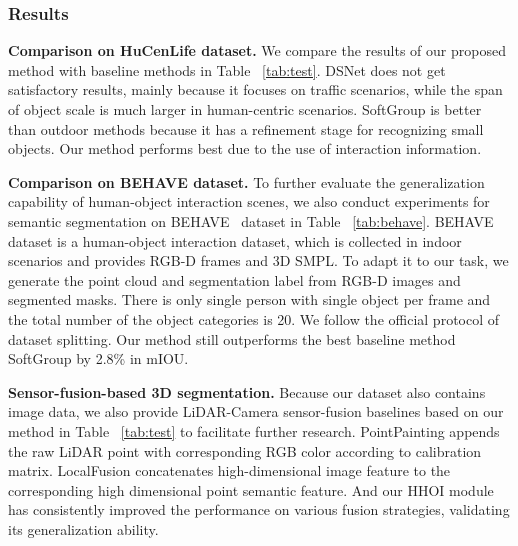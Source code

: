 \subsubsection{Results}

\noindent\textbf{Comparison on HuCenLife dataset. } 
We compare the results of our proposed method with baseline methods in Table ~\ref{tab:test}. DSNet does not get satisfactory results, mainly because it focuses on traffic scenarios, while the span of object scale is much larger in human-centric scenarios. SoftGroup is better than outdoor methods because it has a refinement stage for recognizing small objects. Our method performs best due to the use of interaction information.




\noindent\textbf{Comparison on BEHAVE dataset. } 
To further evaluate the generalization capability of human-object interaction scenes, we also conduct experiments for semantic segmentation on BEHAVE~\cite{bhatnagar2022behave} dataset in Table ~\ref{tab:behave}. BEHAVE dataset is a human-object interaction dataset, which is collected in indoor scenarios and provides RGB-D frames and 3D SMPL. To adapt it to our task, we generate the point cloud and segmentation label from RGB-D images and segmented masks. There is only single person with single object per frame and the total number of the object categories is 20. We follow the official protocol of dataset splitting. Our method still outperforms the best baseline method SoftGroup by 2.8\% in mIOU. 

\noindent\textbf{Sensor-fusion-based 3D segmentation. }
Because our dataset also contains image data, we also provide LiDAR-Camera sensor-fusion baselines based on our method in Table ~\ref{tab:test} to facilitate further research. PointPainting appends the raw LiDAR point with corresponding RGB color according to calibration matrix. LocalFusion concatenates high-dimensional image feature to the corresponding high dimensional point semantic feature. And our HHOI module has consistently improved the performance on various fusion strategies, validating its generalization ability.



